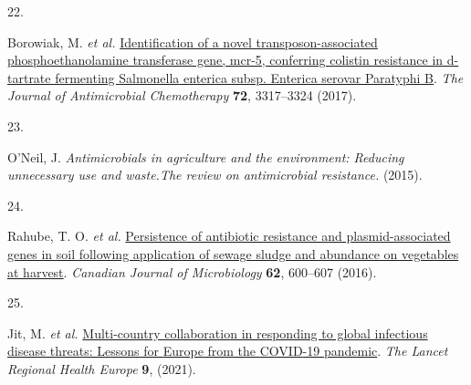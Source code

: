 \documentclass[
]{book}
\newlength{\cslhangindent}
\newlength{\csllabelwidth}
\newlength{\cslentryspacingunit} %
\newenvironment{CSLReferences}[2] %
 {%
  \setlength{\parindent}{0pt}
  \ifodd #1
  \let\oldpar\par
  \def\par{\hangindent=\cslhangindent\oldpar}
  \fi
  \setlength{\parskip}{#2\cslentryspacingunit}
 }%
 {}
\newcommand{\CSLLeftMargin}[1]{\parbox[t]{\csllabelwidth}{#1}}
\newcommand{\CSLRightInline}[1]{\parbox[t]{\linewidth - \csllabelwidth}{#1}\break}
\begin{document}
\begin{CSLReferences}{0}{0}
\leavevmode{}%
\CSLLeftMargin{22. }
\CSLRightInline{Borowiak, M. \emph{et al.} \href{https://doi.org/10.1093/jac/dkx327}{Identification of a novel transposon-associated phosphoethanolamine transferase gene, mcr-5, conferring colistin resistance in d-tartrate fermenting {Salmonella} enterica subsp. Enterica serovar {Paratyphi B}}. \emph{The Journal of Antimicrobial Chemotherapy} \textbf{72}, 3317--3324 (2017).}

\leavevmode{}%
\CSLLeftMargin{23. }
\CSLRightInline{O'Neil, J. \emph{Antimicrobials in agriculture and the environment: Reducing unnecessary use and waste.{The} review on antimicrobial resistance.} (2015).}

\leavevmode{}%
\CSLLeftMargin{24. }
\CSLRightInline{Rahube, T. O. \emph{et al.} \href{https://doi.org/10.1139/cjm-2016-0034}{Persistence of antibiotic resistance and plasmid-associated genes in soil following application of sewage sludge and abundance on vegetables at harvest}. \emph{Canadian Journal of Microbiology} \textbf{62}, 600--607 (2016).}

\leavevmode{}%
\CSLLeftMargin{25. }
\CSLRightInline{Jit, M. \emph{et al.} \href{https://doi.org/10.1016/j.lanepe.2021.100221}{Multi-country collaboration in responding to global infectious disease threats: Lessons for {Europe} from the {COVID}-19 pandemic}. \emph{The Lancet Regional Health \textendash{} Europe} \textbf{9}, (2021).}

\end{CSLReferences}
\end{document}
